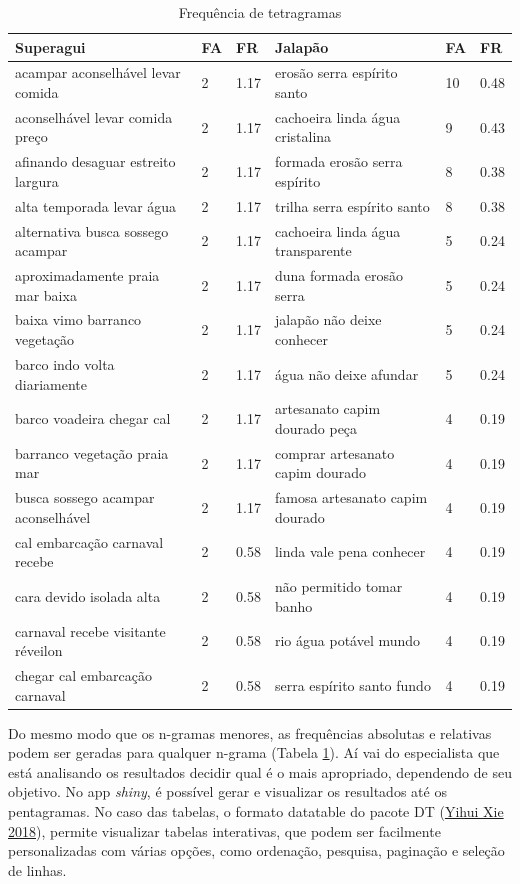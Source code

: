 \documentclass[preprint, 3p,
authoryear]{elsarticle} %
\begin{document}
\begin{table}[!h]

\caption{\label{tab:tab5}\label{tab5}Frequência de tetragramas}
\centering
\begin{tabular}[t]{llllll}
\toprule
\textbf{Superagui} & \textbf{FA} & \textbf{FR} & \textbf{Jalapão} & \textbf{FA} & \textbf{FR}\\
\midrule
acampar aconselhável levar comida & 2 & 1.17 & erosão serra espírito santo & 10 & 0.48\\
aconselhável levar comida preço & 2 & 1.17 & cachoeira linda água cristalina & 9 & 0.43\\
afinando desaguar estreito largura & 2 & 1.17 & formada erosão serra espírito & 8 & 0.38\\
alta temporada levar água & 2 & 1.17 & trilha serra espírito santo & 8 & 0.38\\
alternativa busca sossego acampar & 2 & 1.17 & cachoeira linda água transparente & 5 & 0.24\\
\addlinespace
aproximadamente praia mar baixa & 2 & 1.17 & duna formada erosão serra & 5 & 0.24\\
baixa vimo barranco vegetação & 2 & 1.17 & jalapão não deixe conhecer & 5 & 0.24\\
barco indo volta diariamente & 2 & 1.17 & água não deixe afundar & 5 & 0.24\\
barco voadeira chegar cal & 2 & 1.17 & artesanato capim dourado peça & 4 & 0.19\\
barranco vegetação praia mar & 2 & 1.17 & comprar artesanato capim dourado & 4 & 0.19\\
\addlinespace
busca sossego acampar aconselhável & 2 & 1.17 & famosa artesanato capim dourado & 4 & 0.19\\
cal embarcação carnaval recebe & 2 & 0.58 & linda vale pena conhecer & 4 & 0.19\\
cara devido isolada alta & 2 & 0.58 & não permitido tomar banho & 4 & 0.19\\
carnaval recebe visitante réveilon & 2 & 0.58 & rio água potável mundo & 4 & 0.19\\
chegar cal embarcação carnaval & 2 & 0.58 & serra espírito santo fundo & 4 & 0.19\\
\bottomrule
\end{tabular}
\end{table}

Do mesmo modo que os n-gramas menores, as frequências absolutas e
relativas podem ser geradas para qualquer n-grama (Tabela \ref{tab5}).
Aí vai do especialista que está analisando os resultados decidir qual é
o mais apropriado, dependendo de seu objetivo. No app \emph{shiny}, é
possível gerar e visualizar os resultados até os pentagramas. No caso
das tabelas, o formato datatable do pacote DT
(\protect\hyperlink{ref-DT}{Yihui Xie 2018}), permite visualizar tabelas
interativas, que podem ser facilmente personalizadas com várias opções,
como ordenação, pesquisa, paginação e seleção de linhas.
\end{document}
